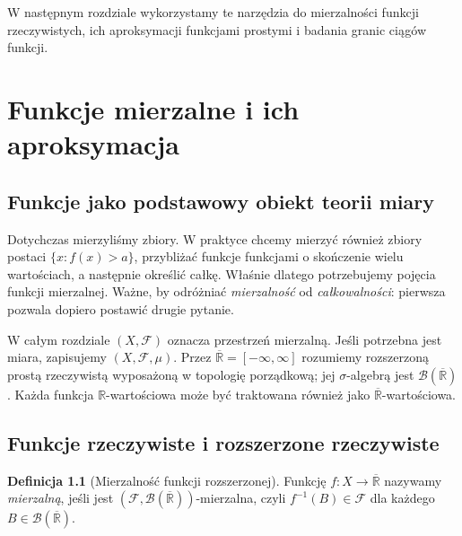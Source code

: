 \documentclass[11pt,a4paper,oneside]{book}
\numberwithin{equation}{chapter}
\theoremstyle{plain}
\theoremstyle{definition}
\newtheorem{definicja}[twierdzenie]{Definicja}
\theoremstyle{remark}
\begin{document}
W następnym rozdziale wykorzystamy te narzędzia do
mierzalności funkcji rzeczywistych, ich aproksymacji
funkcjami prostymi i badania granic ciągów funkcji.



\chapter{Funkcje mierzalne i ich aproksymacja}
\label{ch:funkcje-mierzalne}

\section{Funkcje jako podstawowy obiekt teorii miary}

Dotychczas mierzyliśmy zbiory. W praktyce chcemy mierzyć
również zbiory postaci $\{x:f(x)>a\}$, przybliżać
funkcje funkcjami o skończenie wielu wartościach, a następnie
określić całkę. Właśnie dlatego potrzebujemy pojęcia
funkcji mierzalnej. Ważne, by odróżniać \emph{mierzalność}
od \emph{całkowalności}: pierwsza pozwala dopiero
postawić drugie pytanie.

W całym rozdziale $(X,\mathcal F)$ oznacza przestrzeń mierzalną.
Jeśli potrzebna jest miara, zapisujemy $(X,\mathcal F,\mu)$.
Przez $\overline{\mathbb R}=[-\infty,\infty]$ rozumiemy
rozszerzoną prostą rzeczywistą wyposażoną w topologię
porządkową; jej $\sigma$-algebrą jest
$\mathcal B(\overline{\mathbb R})$. Każda funkcja
$\mathbb R$-wartościowa może być traktowana również jako
$\overline{\mathbb R}$-wartościowa.

\section{Funkcje rzeczywiste i rozszerzone rzeczywiste}

\begin{definicja}[Mierzalność funkcji rozszerzonej]
\label{def:extended-measurable}
Funkcję $f:X\to\overline{\mathbb R}$ nazywamy
\emph{mierzalną}, jeśli jest
$(\mathcal F,\mathcal B(\overline{\mathbb R}))$-mierzalna,
czyli $f^{-1}(B)\in\mathcal F$ dla każdego
$B\in\mathcal B(\overline{\mathbb R})$.
\end{definicja}
\end{document}
